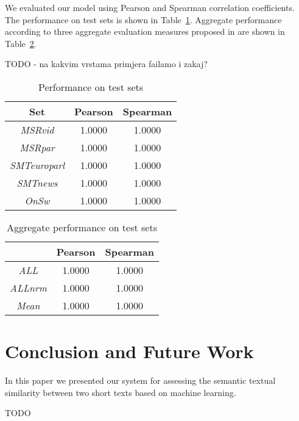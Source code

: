 \documentclass[10pt, a4paper]{article}
\begin{document}
We evaluated our model using Pearson and Spearman correlation coefficients. The performance on test sets is shown in Table~\ref{tab:test-results-table}. Aggregate performance according to three aggregate evaluation measures proposed in \citep{agirre2012semeval} are shown in Table~\ref{tab:all-results-table}.

TODO - na kakvim vrstama primjera failamo i zakaj?

\begin{table}[h]
\caption{Performance on test sets}
\label{tab:test-results-table}
\begin{center}
\begin{tabular}{ccc}
\toprule
Set & Pearson & Spearman \\
\midrule
\textit{MSRvid} & 1.0000 & 1.0000 \\
\textit{MSRpar} & 1.0000 & 1.0000 \\
\textit{SMTeuroparl} & 1.0000 & 1.0000 \\
\textit{SMTnews} & 1.0000 & 1.0000 \\
\textit{OnSw} & 1.0000 & 1.0000 \\
\bottomrule
\end{tabular}
\end{center}
\end{table}

\begin{table}[h]
\caption{Aggregate performance on test sets}
\label{tab:all-results-table}
\begin{center}
\begin{tabular}{ccc}
\toprule
& Pearson & Spearman \\
\midrule
\textit{ALL} & 1.0000 & 1.0000 \\
\textit{ALLnrm} & 1.0000 & 1.0000 \\
\textit{Mean} & 1.0000 & 1.0000 \\
\bottomrule
\end{tabular}
\end{center}
\end{table}

\section{Conclusion and Future Work}

In this paper we presented our system for assessing the semantic textual similarity between two short texts based on machine learning. 

TODO

\nocite{*}

 
\end{document}

